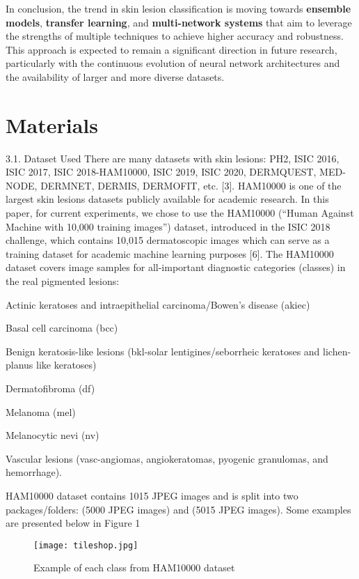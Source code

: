 \documentclass{article}
\begin{document}
In conclusion, the trend in skin lesion classification is moving towards \textbf{ensemble models}, \textbf{transfer learning}, and \textbf{multi-network systems} that aim to leverage the strengths of multiple techniques to achieve higher accuracy and robustness. This approach is expected to remain a significant direction in future research, particularly with the continuous evolution of neural network architectures and the availability of larger and more diverse datasets.


\section{Materials}

3.1. Dataset Used
There are many datasets with skin lesions: PH2, ISIC 2016, ISIC 2017, ISIC 2018-HAM10000, ISIC 2019, ISIC 2020, DERMQUEST, MED-NODE, DERMNET, DERMIS, DERMOFIT, etc. [3]. HAM10000 is one of the largest skin lesions datasets publicly available for academic research. In this paper, for current experiments, we chose to use the HAM10000 (“Human Against Machine with 10,000 training images”) dataset, introduced in the ISIC 2018 challenge, which contains 10,015 dermatoscopic images which can serve as a training dataset for academic machine learning purposes [6]. The HAM10000 dataset covers image samples for all-important diagnostic categories (classes) in the real pigmented lesions:

Actinic keratoses and intraepithelial carcinoma/Bowen’s disease (akiec)

Basal cell carcinoma (bcc)

Benign keratosis-like lesions (bkl-solar lentigines/seborrheic keratoses and lichen-planus like keratoses)

Dermatofibroma (df)

Melanoma (mel)

Melanocytic nevi (nv)

Vascular lesions (vasc-angiomas, angiokeratomas, pyogenic granulomas, and hemorrhage).

HAM10000 dataset contains 1015 JPEG images and is split into two packages/folders:  (5000 JPEG images) and  (5015 JPEG images). Some examples are presented below in Figure 1



\begin{figure}[htbp]
\centering
\texttt{[image: tileshop.jpg]}  %
\caption{Example of each class from HAM10000 dataset }


\label{fig:your_label}
\end{figure}
\end{document}

